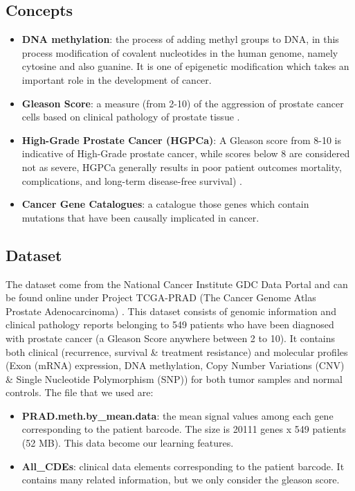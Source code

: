 \documentclass[a4paper,oneside]{article}
\begin{document}
\subsection{Concepts}
\begin{itemize}
\item \textbf{DNA methylation}: the process of adding methyl groups to DNA, in this process modification of covalent nucleotides in the human genome, namely cytosine and also guanine. It is one of epigenetic modification which takes an important role in the development of cancer.
\item \textbf{Gleason Score}: a measure (from 2-10) of the aggression of prostate cancer cells based on clinical pathology of prostate tissue \cite{prostate}.
\item \textbf{High-Grade Prostate Cancer (HGPCa)}: A Gleason score from 8-10 is indicative of High-Grade prostate cancer, while scores below 8 are considered not as severe, HGPCa generally results in poor patient outcomes mortality, complications, and long-term disease-free survival) \cite{prostate}.
\item \textbf{Cancer Gene Catalogues}: a catalogue those genes which contain mutations that have been causally implicated in cancer.
\end{itemize}

\subsection{Dataset}
The dataset come from the National Cancer Institute GDC Data Portal and can be found online under Project TCGA-PRAD (The Cancer Genome Atlas Prostate Adenocarcinoma) \cite{praddata}. This dataset consists of genomic information and clinical pathology reports belonging to 549 patients who have been diagnosed with prostate cancer (a Gleason Score anywhere between 2 to 10). It contains both clinical (recurrence, survival \& treatment resistance) and molecular profiles (Exon (mRNA) expression, DNA methylation, Copy Number Variations (CNV) \& Single Nucleotide Polymorphism (SNP)) for both tumor samples and normal controls. The file that we used are:
\begin{itemize}
\item \textbf{PRAD.meth.by\_mean.data}: the mean signal values among each gene corresponding to the patient barcode. The size is 20111 genes x 549 patients (52 MB). This data become our learning features.
\item \textbf{All\_CDEs}: clinical data elements corresponding to the patient barcode. It contains many related information, but we only consider the gleason score.
\end{itemize}
\end{document}
